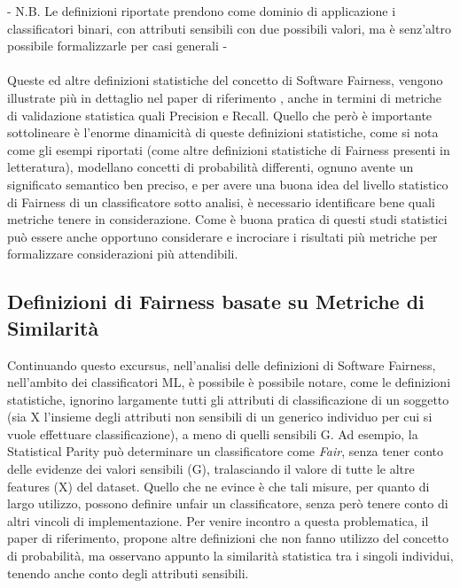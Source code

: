 - N.B. Le definizioni riportate prendono come dominio di applicazione i classificatori binari, con attributi sensibili con due possibili valori, ma è senz'altro possibile formalizzarle per casi generali - \\ \\
Queste ed altre definizioni statistiche del concetto di Software Fairness, vengono illustrate più in dettaglio nel paper di riferimento \cite{evalFairClassification}, anche in termini di metriche di validazione statistica quali Precision e Recall. Quello che però è importante sottolineare è l'enorme dinamicità di queste definizioni statistiche, come si nota come gli esempi riportati (come altre definizioni statistiche di Fairness presenti in letteratura), modellano concetti di probabilità differenti, ognuno avente un significato semantico ben preciso, e per avere una buona idea del livello statistico di Fairness di un classificatore sotto analisi, è necessario identificare bene quali metriche tenere in considerazione. Come è buona pratica di questi studi statistici può essere anche opportuno considerare e incrociare i risultati più metriche per formalizzare considerazioni più attendibili.

 \subsection{Definizioni di Fairness basate su Metriche di Similarità}
 
 Continuando questo excursus, nell'analisi delle definizioni di Software Fairness, nell'ambito dei classificatori ML, è possibile è possibile notare, come le definizioni statistiche, ignorino largamente tutti gli attributi di classificazione di un soggetto (sia X l'insieme degli attributi non sensibili di un generico individuo per cui si vuole effettuare classificazione), a meno di quelli sensibili G. Ad esempio, la Statistical Parity può determinare un classificatore come \emph{Fair}, senza tener conto delle evidenze dei valori sensibili (G), tralasciando il valore di tutte le altre features (X) del dataset. Quello che ne evince è che tali misure, per quanto di largo utilizzo, possono definire unfair un classificatore, senza però tenere conto di altri vincoli di implementazione\cite{FairnessDefinitionExplained}. Per venire incontro a questa problematica, il paper di riferimento, propone altre definizioni che non fanno utilizzo del concetto di probabilità, ma osservano appunto la similarità statistica tra i singoli individui, tenendo anche conto degli attributi sensibili\cite{FairnessDefinitionExplained}.\\
 
